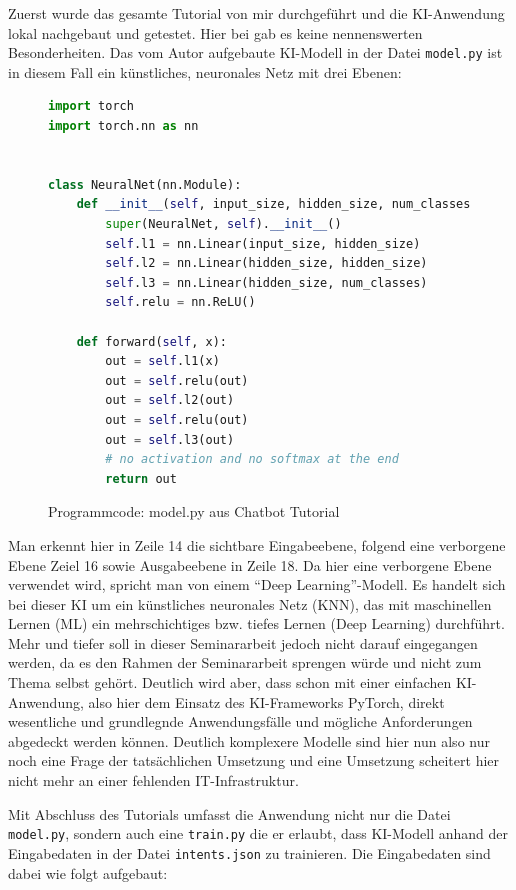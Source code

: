 \documentclass[12pt,oneside,titlepage,listof=totoc,bibliography=totoc]{scrartcl}
\newcommand{\code}[1]{\colorbox{code-gray}{\texttt{#1}}}
\begin{document}
Zuerst wurde das gesamte Tutorial von mir durchgeführt und die KI-Anwendung lokal nachgebaut und getestet. Hier bei gab es keine nennenswerten Besonderheiten. Das vom Autor aufgebaute KI-Modell in der Datei \code{model.py} ist in diesem Fall ein künstliches, neuronales Netz mit drei Ebenen:

\begin{figure}[H]
	\caption{Programmcode: model.py aus Chatbot Tutorial}
	\label{fig:code-model-py-chatbot-tut}
\begin{lstlisting}[language=python]
import torch
import torch.nn as nn


class NeuralNet(nn.Module):
    def __init__(self, input_size, hidden_size, num_classes):
        super(NeuralNet, self).__init__()
        self.l1 = nn.Linear(input_size, hidden_size) 
        self.l2 = nn.Linear(hidden_size, hidden_size) 
        self.l3 = nn.Linear(hidden_size, num_classes)
        self.relu = nn.ReLU()
    
    def forward(self, x):
        out = self.l1(x)
        out = self.relu(out)
        out = self.l2(out)
        out = self.relu(out)
        out = self.l3(out)
        # no activation and no softmax at the end
        return out
\end{lstlisting}
\end{figure}

Man erkennt hier in Zeile 14 die sichtbare Eingabeebene, folgend eine verborgene Ebene Zeiel 16 sowie Ausgabeebene in Zeile 18. Da hier eine verborgene Ebene verwendet wird, spricht man von einem \enquote{Deep Learning}-Modell. Es handelt sich bei dieser \acl{KI} um ein künstliches neuronales Netz (KNN), das mit maschinellen Lernen (ML) ein mehrschichtiges bzw. tiefes Lernen (Deep Learning) durchführt. Mehr und tiefer soll in dieser Seminararbeit jedoch nicht darauf eingegangen werden, da es den Rahmen der Seminararbeit sprengen würde und nicht zum Thema selbst gehört. Deutlich wird aber, dass schon mit einer einfachen KI-Anwendung, also hier dem Einsatz des KI-Frameworks PyTorch, direkt wesentliche und grundlegnde Anwendungsfälle und mögliche Anforderungen abgedeckt werden können. Deutlich komplexere Modelle sind hier nun also nur noch eine Frage der tatsächlichen Umsetzung und eine Umsetzung scheitert hier nicht mehr an einer fehlenden IT-Infrastruktur.

Mit Abschluss des Tutorials umfasst die Anwendung nicht nur die Datei \code{model.py}, sondern auch eine \code{train.py} die er erlaubt, dass KI-Modell anhand der Eingabedaten in der Datei \code{intents.json} zu trainieren. Die Eingabedaten sind dabei wie folgt aufgebaut:
\end{document}
